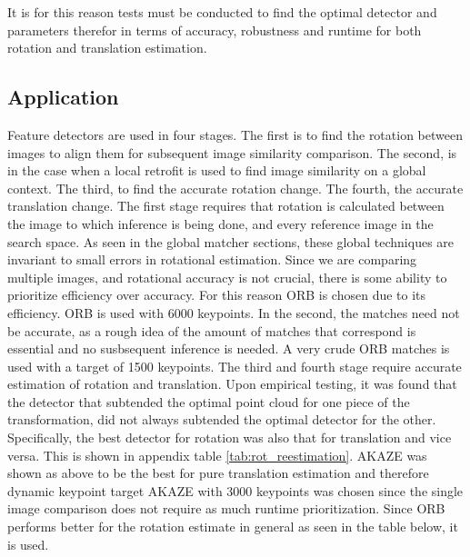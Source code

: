 It is for this reason tests must be conducted to find the optimal detector and parameters therefor in terms of accuracy, robustness and runtime for both rotation and translation estimation.



\subsection*{Application}
Feature detectors are used in four stages. The first is to find the rotation between images to align them for subsequent image similarity comparison. The second, is in the case when a local retrofit is used to find image similarity on a global context. The third, to find the accurate rotation change. The fourth, the accurate translation change. 
The first stage requires that rotation is calculated between the image to which inference is being done, and every reference image in the search space. As seen in the global matcher sections, these global techniques are invariant to small errors in rotational estimation. Since we are comparing multiple images, and rotational accuracy is not crucial, there is some ability to prioritize efficiency over accuracy. For this reason ORB is chosen due to its efficiency. ORB is used with 6000 keypoints. 
In the second, the matches need not be accurate, as a rough idea of the amount of matches that correspond is essential and no susbsequent inference is needed. A very crude ORB matches is used with a target of 1500 keypoints.
The third and fourth stage require accurate estimation of rotation and translation. Upon empirical testing, it was found that the detector that subtended the optimal point cloud for one piece of the transformation, did not always subtended the optimal detector for the other. Specifically, the best detector for rotation was also that for translation and vice versa. This is shown in appendix table \ref{tab:rot_reestimation}. AKAZE was shown as above to be the best for pure translation estimation and therefore dynamic keypoint target AKAZE with 3000 keypoints was chosen since the single image comparison does not require as much runtime prioritization. Since ORB performs better for the rotation estimate in general as seen in the table below, it is used. 


